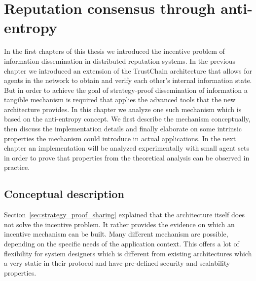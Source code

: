 \chapter{Reputation consensus through anti-entropy}

In the first chapters of this thesis we introduced the incentive problem of information dissemination 
in distributed reputation systems. In the previous chapter we introduced an extension of the TrustChain
architecture that allows for agents in the network to obtain and verify each other's internal 
information state. But in order to achieve the goal of strategy-proof dissemination of information
a tangible mechanism is required that applies the advanced tools that the new architecture provides.
In this chapter we analyze one such mechanism which is based on the anti-entropy concept. We first
describe the mechanism conceptually, then discuss the implementation details and finally elaborate
on some intrinsic properties the mechanism could introduce in actual applications. In the next
chapter an implementation will be analyzed experimentally with small agent sets in order to prove
that properties from the theoretical analysis can be observed in practice.

\section{Conceptual description}



Section~\ref{sec:strategy_proof_sharing} explained that the architecture itself does not solve the 
incentive problem. It rather provides the evidence on which an incentive mechanism can be built. 
Many different mechanism are possible, depending on the specific needs of the application context. 
This offers a lot of flexibility for system designers which is different from existing architectures
which a very static in their protocol and have pre-defined security and scalability properties.

